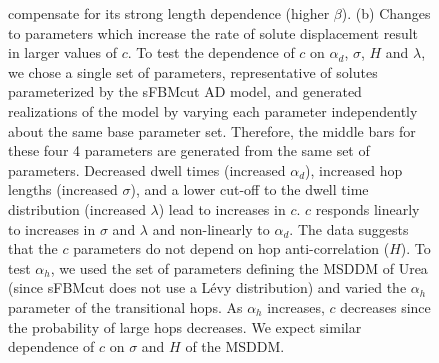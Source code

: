 \documentclass{article}
\begin{document}
\begin{figure}
{  compensate for its strong length dependence (higher $\beta$). (b) Changes to parameters
  which increase the rate of solute displacement result in larger values of $c$. 
  To test the dependence of $c$ on $\alpha_d$, $\sigma$, $H$ and $\lambda$, we chose a 
  single set of parameters, representative of solutes parameterized by the sFBMcut AD model,
  and generated realizations of the model by varying each parameter independently about the
  same base parameter set. Therefore, the middle bars for these four 4 parameters are 
  generated from the same set of parameters. Decreased dwell times (increased $\alpha_d$),
  increased hop lengths (increased $\sigma$), and a lower cut-off to the dwell time
  distribution (increased $\lambda$) lead to increases in $c$. $c$ responds linearly
  to increases in $\sigma$ and $\lambda$ and non-linearly to $\alpha_d$. The data 
  suggests that the $c$ parameters do not depend on hop anti-correlation ($H$). To test 
  $\alpha_h$, we used the set of parameters defining the MSDDM of Urea (since sFBMcut does
  not use a L\'evy distribution) and varied the $\alpha_h$ parameter of the transitional
  hops. As $\alpha_h$ increases, $c$ decreases since the probability of large hops decreases.
  We expect similar dependence of $c$ on $\sigma$ and $H$ of the MSDDM.}\label{fig:c}
  \end{figure}
  

\end{document}
